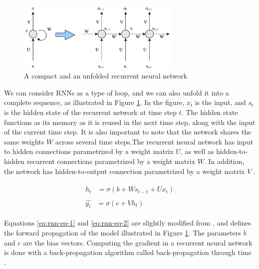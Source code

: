 \begin{figure}[ht]
    \centering
    \includegraphics[width=0.7\textwidth]{fig/related_work/nn_recurrent.pdf}
    \caption{A compact and an unfolded recurrent neural network}
    \label{fig:nn-rnn}
\end{figure}

We can consider RNNs as a type of loop, and we can also unfold it into a complete sequence, as illustrated in Figure \ref{fig:nn-rnn}. In the figure, \(x_{t}\) is the input, and \(s_{t}\) is the hidden state of the recurrent network at time step \(t\). The hidden state functions as its memory as it is reused in the next time step, along with the input of the current time step. It is also important to note that the network shares the same weights \(W\) across several time steps.The recurrent neural network has input to hidden connections parametrized by a weight matrix \(U\), as well as hidden-to-hidden recurrent connections parametrized by a weight matrix \(W\). In addition, the network has hidden-to-output connection parametrized by a weight matrix \(V\) \citep{goodfellow2016deeplearning}.

\begin{align}
    \begin{split}\label{eq:rnn-eq-1}
        h_{t}&=\sigma(b+Ws_{t-1}+Ux_{t})
    \end{split}\\
    \begin{split}\label{eq:rnn-eq-2}
        \hat{y_{t}}&=\sigma(c+Vh_{t})
    \end{split}
\end{align}

Equations \ref{eq:rnn-eq-1} and \ref{eq:rnn-eq-2} are slightly modified from \citep{goodfellow2016deeplearning}, and defines the forward propagation of the model illustrated in Figure \ref{fig:nn-rnn}. The parameters \(b\) and \(c\) are the bias vectors. Computing the gradient in a recurrent neural network is done with a back-propagation algorithm called back-propagation through time \citep{werbos1990backpropagation}. 

